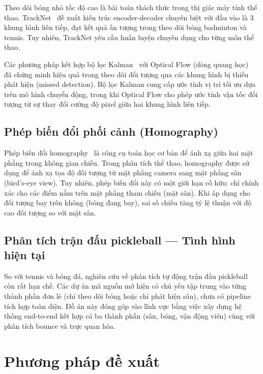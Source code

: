 \documentclass[12pt,a4paper]{article}
\begin{document}
Theo dõi bóng nhỏ tốc độ cao là bài toán thách thức trong thị giác máy tính thể thao. TrackNet~\cite{tracknet2019} đề xuất kiến trúc encoder-decoder chuyên biệt với đầu vào là 3 khung hình liên tiếp, đạt kết quả ấn tượng trong theo dõi bóng badminton và tennis. Tuy nhiên, TrackNet yêu cầu huấn luyện chuyên dụng cho từng môn thể thao.

Các phương pháp kết hợp bộ lọc Kalman~\cite{kalman1960} với Optical Flow (dòng quang học)~\cite{lucas1981} đã chứng minh hiệu quả trong theo dõi đối tượng qua các khung hình bị thiếu phát hiện (missed detection). Bộ lọc Kalman cung cấp ước tính vị trí tối ưu dựa trên mô hình chuyển động, trong khi Optical Flow cho phép ước tính vận tốc đối tượng từ sự thay đổi cường độ pixel giữa hai khung hình liên tiếp.

\subsection{Phép biến đổi phối cảnh (Homography)}

Phép biến đổi homography~\cite{hartley2003} là công cụ toán học cơ bản để ánh xạ giữa hai mặt phẳng trong không gian chiếu. Trong phân tích thể thao, homography được sử dụng để ánh xạ tọa độ đối tượng từ mặt phẳng camera sang mặt phẳng sân (bird's-eye view). Tuy nhiên, phép biến đổi này có một giới hạn cố hữu: chỉ chính xác cho các điểm nằm trên mặt phẳng tham chiếu (mặt sân). Khi áp dụng cho đối tượng bay trên không (bóng đang bay), sai số chiếu tăng tỷ lệ thuận với độ cao đối tượng so với mặt sân.

\subsection{Phân tích trận đấu pickleball --- Tình hình hiện tại}

So với tennis và bóng đá, nghiên cứu về phân tích tự động trận đấu pickleball còn rất hạn chế. Các dự án mã nguồn mở hiện có chủ yếu tập trung vào từng thành phần đơn lẻ (chỉ theo dõi bóng hoặc chỉ phát hiện sân), chưa có pipeline tích hợp toàn diện. Đồ án này đóng góp vào lĩnh vực bằng việc xây dựng hệ thống end-to-end kết hợp cả ba thành phần (sân, bóng, vận động viên) cùng với phân tích bounce và trực quan hóa.

\section{Phương pháp đề xuất}
\label{sec:methodology}
\end{document}
